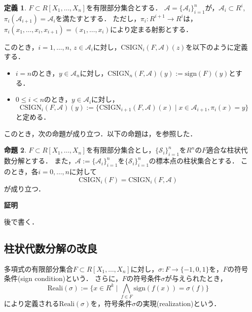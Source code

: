 \documentclass[uplatex, dvipdfmx]{jsarticle}
\makeatletter
\numberwithin{equation}{section}
\renewenvironment{proof}[1][\proofname]{\par
  \pushQED{\qed}%
  \normalfont \topsep6\p@\@plus6\p@\relax
  \trivlist
  \item\relax
  {\bfseries
  #1\@addpunct{.}}\hspace\labelsep\ignorespaces
}{
  \popQED\endtrivlist\@endpefalse
}
\newcommand{\calS}{\mathcal{S}}
\newcommand{\Reali}{\mathrm{Reali}}
\newcommand{\sign}{\mathrm{sign}}
\newcommand{\CSIGN}{\mathrm{CSIGN}}
\newcommand{\map}[3]{{#1}\colon{#2}\rightarrow{#3}}
\theoremstyle{definition}
\newtheorem{definition}{定義}[section]
\newtheorem{proposition}[definition]{命題}
\renewcommand{\proofname}{\textbf{証明}}
\makeatother
\begin{document}
\begin{definition}
     $F \subset R[X_1, \dots, X_n]$を有限部分集合とする．
     $\mathcal{A}=\{\mathcal{A}_{i}\}_{i=1}^n$が，$\mathcal{A}_i \subset R^i$, $\pi_i(\mathcal{A}_{i+1}) = \mathcal{A}_i$を満たすとする．
     ただし，$\map{\pi_i}{R^{i+1}}{R^i}$は，$\pi_i(x_1, \dots, x_i, x_{i+1}) = (x_1, \dots, x_i)$により定まる射影とする．

     このとき，$i=1, \dots, n$, $z \in \mathcal{A}_i$に対し，$\CSIGN_i(F, \mathcal{A})(z)$を以下のように定義する．
     \begin{itemize}
          \item $i=n$のとき，$y \in \mathcal{A}_n$に対し，$\CSIGN_n(F, \mathcal{A})(y):=\sign(F)(y)$とする．
          \item $0 \leq i < n$のとき，$y \in \mathcal{A}_i$に対し，
          \begin{equation}
               \CSIGN_i(F, \mathcal{A})(y):= \{\CSIGN_{i+1}(F, \mathcal{A})(x) \mid x \in \mathcal{A}_{i+1}, \pi_i(x) = y\}
          \end{equation}
          と定める．
     \end{itemize}
\end{definition}

このとき，次の命題が成り立つ．以下の命題は，\cite[Proposition 11.9.]{MR2248869}を参照した．
\begin{proposition}
     $F \subset R[X_1, \dots, X_n]$を有限部分集合とし，$\{\calS_i\}_{i=1}^n$を$R^n$の$F$適合な柱状代数分解とする．
     また，$\mathcal{A}:= \{\mathcal{A}_{i}\}_{i=1}^n$を$\{\calS_i\}_{i=1}^n$の標本点の柱状集合とする．
     このとき，各$i=0, \dots, n$に対して
     \begin{equation}
          \CSIGN_i(F) = \CSIGN_i(F, \mathcal{A})
     \end{equation}
     が成り立つ．
\end{proposition}

\begin{proof}
     後で書く．
\end{proof}


\subsection{柱状代数分解の改良}
多項式の有限部分集合$F \subset R[X_1, \dots, X_n]$に対し，$\map{\sigma}{F}{\{-1,0,1\}}$を，$F$の符号条件(sign condition)という．
さらに，$F$の符号条件$\sigma$が与えられたとき，
\begin{equation}
     \Reali(\sigma):= \{x \in R^k \mid \bigwedge_{f \in F} \sign(f(x)) = \sigma(f)\}
\end{equation}
により定義される$\Reali(\sigma)$を，符号条件$\sigma$の実現(realization)という．
\end{document}
